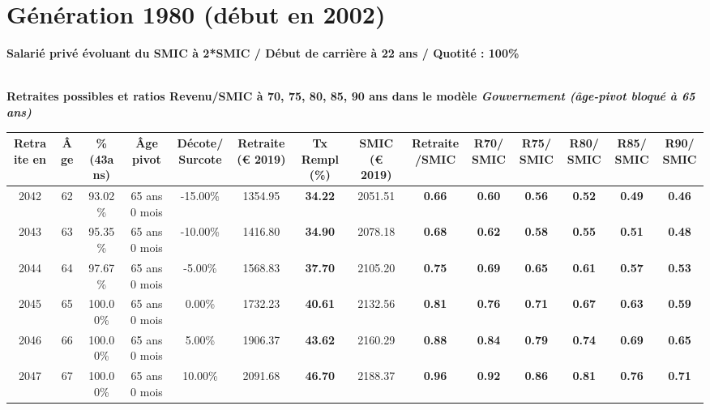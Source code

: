 \newpage 
 
\section{Génération 1980 (début en 2002)\label{Ascendant12_100_1980_22_0}} 
 
{\bf \noindent Salarié privé évoluant du SMIC à 2*SMIC / Début de carrière à 22 ans / Quotité : 100\%}  ~ 

 ~\\{\bf \noindent Retraites possibles et ratios Revenu/SMIC à 70, 75, 80, 85, 90 ans dans le modèle \emph{Gouvernement (âge-pivot bloqué à 65 ans)}}  
 
\begin{adjustbox}{max width=\textwidth} 
\begin{tabular}[htb]{|c|c||c|c|c||c|c||c|c||c|c|c|c|c|} 
\hline 
 Retraite en &  Âge &  \%(43ans) &  Âge pivot &  Décote/Surcote &  Retraite (\euro{} 2019) &  Tx Rempl(\%) &  SMIC (\euro{} 2019) &  Retraite/SMIC &  R70/SMIC &  R75/SMIC &  R80/SMIC &  R85/SMIC &  R90/SMIC \\ 
\hline \hline 
 2042 &  62 &  93.02\% &  65 ans 0 mois &  -15.00\% &  1354.95 &  {\bf 34.22} &  2051.51 &  {\bf {\color{red} 0.66}} &  {\bf {\color{red} 0.60}} &  {\bf {\color{red} 0.56}} &  {\bf {\color{red} 0.52}} &  {\bf {\color{red} 0.49}} &  {\bf {\color{red} 0.46}} \\ 
\hline 
 2043 &  63 &  95.35\% &  65 ans 0 mois &  -10.00\% &  1416.80 &  {\bf 34.90} &  2078.18 &  {\bf {\color{red} 0.68}} &  {\bf {\color{red} 0.62}} &  {\bf {\color{red} 0.58}} &  {\bf {\color{red} 0.55}} &  {\bf {\color{red} 0.51}} &  {\bf {\color{red} 0.48}} \\ 
\hline 
 2044 &  64 &  97.67\% &  65 ans 0 mois &  -5.00\% &  1568.83 &  {\bf 37.70} &  2105.20 &  {\bf {\color{red} 0.75}} &  {\bf {\color{red} 0.69}} &  {\bf {\color{red} 0.65}} &  {\bf {\color{red} 0.61}} &  {\bf {\color{red} 0.57}} &  {\bf {\color{red} 0.53}} \\ 
\hline 
 2045 &  65 &  100.00\% &  65 ans 0 mois &  0.00\% &  1732.23 &  {\bf 40.61} &  2132.56 &  {\bf {\color{red} 0.81}} &  {\bf {\color{red} 0.76}} &  {\bf {\color{red} 0.71}} &  {\bf {\color{red} 0.67}} &  {\bf {\color{red} 0.63}} &  {\bf {\color{red} 0.59}} \\ 
\hline 
 2046 &  66 &  100.00\% &  65 ans 0 mois &  5.00\% &  1906.37 &  {\bf 43.62} &  2160.29 &  {\bf {\color{red} 0.88}} &  {\bf {\color{red} 0.84}} &  {\bf {\color{red} 0.79}} &  {\bf {\color{red} 0.74}} &  {\bf {\color{red} 0.69}} &  {\bf {\color{red} 0.65}} \\ 
\hline 
 2047 &  67 &  100.00\% &  65 ans 0 mois &  10.00\% &  2091.68 &  {\bf 46.70} &  2188.37 &  {\bf {\color{red} 0.96}} &  {\bf {\color{red} 0.92}} &  {\bf {\color{red} 0.86}} &  {\bf {\color{red} 0.81}} &  {\bf {\color{red} 0.76}} &  {\bf {\color{red} 0.71}} \\ 
\hline 
\hline 
\end{tabular} 
\end{adjustbox} 
 
